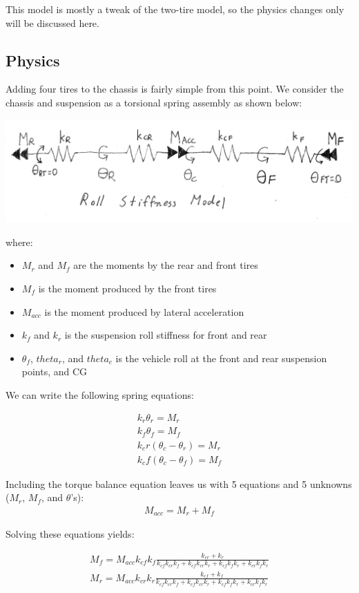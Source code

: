 \documentclass{article}
\begin{document}
This model is mostly a tweak of the two-tire model, so the physics changes only will be discussed here.

\subsection{Physics}

Adding four tires to the chassis is fairly simple from this point. We consider the chassis and suspension as a torsional spring assembly as shown below:

\includegraphics{tors_springs.png}

where:
\begin{itemize}
\item $M_r$ and $M_f$ are the moments by the rear and front tires
\item $M_f$ is the moment produced by the front tires
\item $M_{acc}$ is the moment produced by lateral acceleration
\item $k_f$ and $k_r$ is the suspension roll stiffness for front and rear
\item $\theta_f$, $theta_r$, and $theta_c$ is the vehicle roll at the front and rear suspension points, and CG
\end{itemize}

We can write the following spring equations:

\begin{align}
	k_r \theta_r = M_r \\
	k_f \theta_f = M_f \\
	k_cr (\theta_c-\theta_r) = M_r \\
	k_cf (\theta_c-\theta_f) = M_f
\end{align}

Including the torque balance equation leaves us with 5 equations and 5 unknowns ($M_r$, $M_f$, and $\theta$'s):
\begin{align}
	M_{acc} = M_r + M_f
\end{align}

Solving these equations yields:

\begin{align}
	M_f = M_{acc} k_{cf} k_f \frac{k_{cr}+k_r}{k_{cf} k_{cr} k_f+k_{cf} k_{cr} k_r+k_{cf} k_f k_r+k_{cr} k_f k_r}\\
    M_r = M_{acc} k_{cr} k_r \frac{k_{cf}+k_f}{k_{cf} k_{cr} k_f+k_{cf} k_{cr} k_r+k_{cf} k_f k_r+k_{cr} k_f k_r}
\end{align}
\end{document}
